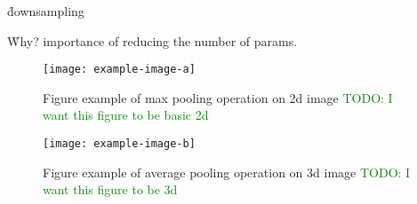 \r{downsampling}

\r{Why? importance of reducing the number of params.}

\begin{figure}[htp]
	\centering
	\texttt{[image: example-image-a]}\hfil
	\caption{Figure example of max pooling operation on 2d image \textcolor{green}{TODO: I want this figure to be basic 2d}}
	\label{fig:pooling_max_2d_ex_a}
\end{figure}

\begin{figure}[htp]
	\centering
	\texttt{[image: example-image-b]}\hfil
	\caption{Figure example of average pooling operation on 3d image \textcolor{green}{TODO: I want this figure to be 3d}}
	\label{fig:pooling_avg_3d_ex_a}
\end{figure}